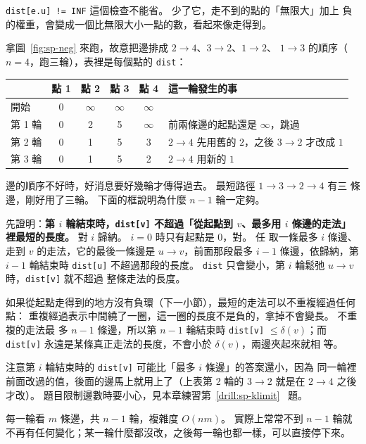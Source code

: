 \texttt{dist[e.u] != INF} 這個檢查不能省。 少了它，走不到的點的「無限大」加上
負的權重，會變成一個比無限大小一點的數，看起來像走得到。

拿圖~\ref{fig:sp-neg} 來跑，故意把邊排成 $2 \to 4$、$3 \to 2$、$1 \to 2$、
$1 \to 3$ 的順序（$n = 4$，跑三輪），表裡是每個點的 \texttt{dist}：

\begin{center}
\begin{tabular}{lccccl}
\toprule
 & 點 1 & 點 2 & 點 3 & 點 4 & 這一輪發生的事 \\
\midrule
開始 & 0 & $\infty$ & $\infty$ & $\infty$ & \\
第 1 輪 & 0 & 2 & 5 & $\infty$ & 前兩條邊的起點還是 $\infty$，跳過 \\
第 2 輪 & 0 & 1 & 5 & 3 & $2 \to 4$ 先用舊的 $2$，之後 $3 \to 2$ 才改成 $1$ \\
第 3 輪 & 0 & 1 & 5 & 2 & $2 \to 4$ 用新的 $1$ \\
\bottomrule
\end{tabular}
\end{center}

邊的順序不好時，好消息要好幾輪才傳得過去。 最短路徑 $1 \to 3 \to 2 \to 4$ 有三
條邊，剛好用了三輪。 下面的框說明為什麼 $n - 1$ 輪一定夠。

\begin{whybox}[$n - 1$ 輪就夠]
先證明：\textbf{第 $i$ 輪結束時，\texttt{dist[v]} 不超過「從起點到 $v$、最多用
$i$ 條邊的走法」裡最短的長度。} 對 $i$ 歸納。 $i = 0$ 時只有起點是 $0$，對。 任
取一條最多 $i$ 條邊、走到 $v$ 的走法，它的最後一條邊是 $u \to v$，前面那段最多
$i - 1$ 條邊，依歸納，第 $i - 1$ 輪結束時 \texttt{dist[u]} 不超過那段的長度。
\texttt{dist} 只會變小，第 $i$ 輪鬆弛 $u \to v$ 時，\texttt{dist[v]} 就不超過
整條走法的長度。

如果從起點走得到的地方沒有負環（下一小節），最短的走法可以不重複經過任何點：
重複經過表示中間繞了一圈，這一圈的長度不是負的，拿掉不會變長。 不重複的走法最
多 $n - 1$ 條邊，所以第 $n - 1$ 輪結束時 \texttt{dist[v]} $\le \delta(v)$；而
\texttt{dist[v]} 永遠是某條真正走法的長度，不會小於 $\delta(v)$，兩邊夾起來就相
等。

注意第 $i$ 輪結束時的 \texttt{dist[v]} 可能比「最多 $i$ 條邊」的答案還小，因為
同一輪裡前面改過的值，後面的邊馬上就用上了（上表第 2 輪的 $3 \to 2$ 就是在
$2 \to 4$ 之後才改）。 題目限制邊數時要小心，見本章練習第~\ref{drill:sp-klimit}~
題。
\end{whybox}

每一輪看 $m$ 條邊，共 $n - 1$ 輪，複雜度 $O(nm)$。 實際上常常不到 $n - 1$ 輪就
不再有任何變化；某一輪什麼都沒改，之後每一輪也都一樣，可以直接停下來。

